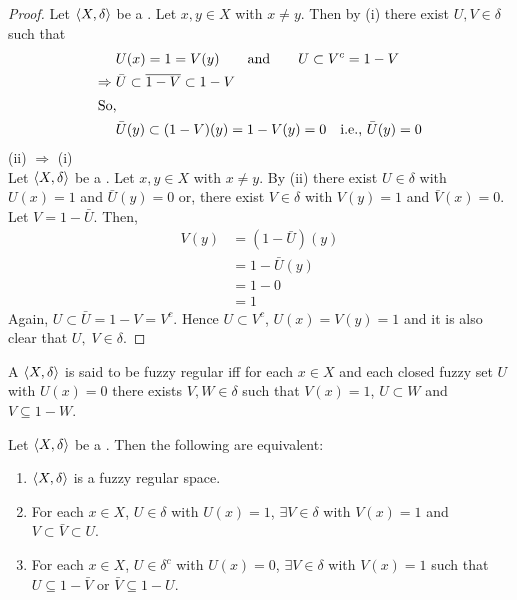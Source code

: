 \documentclass[../main-sheet.tex]{subfiles}
\begin{document}
\begin{proof}
    Let \(\langle X, \delta \rangle\) be a \fts. Let \(x,y\in X\) with \(x\neq y \). Then by (i) there exist \(U,V\in\delta\) such that 
    \begin{align*}
        &U(x)=1=V(y )\qquad \text{and}\qquad U\subset V^c=1-V\\
        \Rightarrow\;& \bar{U} \subset \overline{1-V}\subset 1-V\\
        \intertext{So,}
        & \bar{U}(y) \subset (1-V)(y)=1-V(y)=0\quad\text{i.e., }\bar{U}(y)=0
    \end{align*}
    (ii) \(\Rightarrow\) (i)\\
    Let \(\langle X, \delta \rangle\) be a \fts. Let \(x,y\in X \) with \(x\neq y \). By (ii) there exist \(U\in\delta\) with \(U(x)=1\) and \(\bar{U}(y)=0\) or, there exist \(V\in\delta\) with \(V(y)=1\) and \(\bar{V}(x)=0\).\\
    Let \(V=1-\bar{U}\). Then,
    \begin{align*}
        V(y)&=(1-\bar{U})(y)\\
        &=1-\bar{U}(y)\\
        &=1-0\\
        &=1
    \end{align*}
    Again, \(U\subset \bar{U}=1-V=V^c\). Hence \(U\subset V^c\), \(U(x)=V(y)=1\) and it is also clear that \(U,\;V\in\delta\).
\end{proof}
\begin{defn}
    A \fts \s \(\langle X, \delta \rangle \) is said to be fuzzy regular iff for each \(x\in X \) and each closed  fuzzy set \(U \) with \(U(x)=0\) there exists \(V,W\in\delta\) such that \(V(x)=1\), \(U\subset W \) and \(V\subseteq 1-W \).
\end{defn}
\begin{thm}
    Let \(\langle X, \delta \rangle\) be a \fts. Then the following are equivalent:
    \begin{enumerate}[label=(\roman*)]
        \item \(\langle X, \delta \rangle\) is a fuzzy regular space.
        \item For each \(x\in X \), \(U\in\delta\) with \(U(x)=1\), \(\exists V\in\delta\) with \(V(x)=1\) and \(V\subset \bar{V}\subset U\).
        \item For each \(x\in X \), \(U\in\delta^c \) with \(U(x)=0\), \(\exists V\in\delta\) with \(V(x)=1\) such that \(U\subseteq 1-\bar{V}\) or \(\bar{V}\subseteq 1-U\).
    \end{enumerate}
\end{thm}
\end{document}
